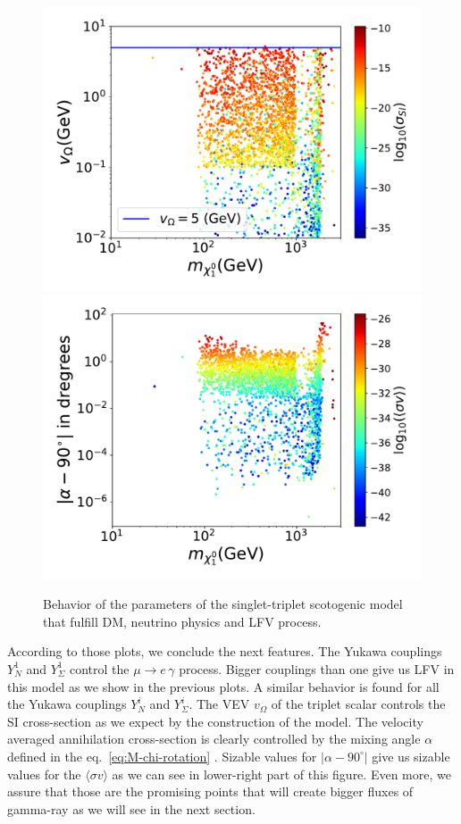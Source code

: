 \documentclass[12pt,letterpaper]{article}
\begin{document}
\begin{figure}
\begin{center}
\includegraphics[scale=0.4]{vT}
\includegraphics[scale=0.4]{alpha}
\caption{Behavior of the parameters of the singlet-triplet scotogenic model that fulfill DM, neutrino physics and LFV process.}
\label{fig:model-parameters}
\end{center}
\end{figure}
According to those plots, we conclude the next features. The Yukawa couplings $Y_{N}^1$ and $Y_{\Sigma}^1$ control the $\mu\rightarrow e\,\gamma$ process. Bigger couplings than one give us LFV in this model as we show in the previous plots. A similar behavior is found for all the Yukawa couplings $Y_{N}^i$ and $Y_{\Sigma}^i$.
The VEV $v_{\Omega}$ of the triplet scalar controls the SI cross-section as we expect by the construction of the model. 
The velocity averaged annihilation cross-section is clearly controlled by the mixing angle $\alpha$ defined in the eq.~\ref{eq:M-chi-rotation} .
Sizable values for $|\alpha-90^{\circ}|$ give us sizable values for the $\langle\sigma v\rangle$ as we can see in lower-right part of this figure. Even more, we assure that those are the promising points that will create bigger fluxes of gamma-ray as we will see in the next section.
\end{document}
